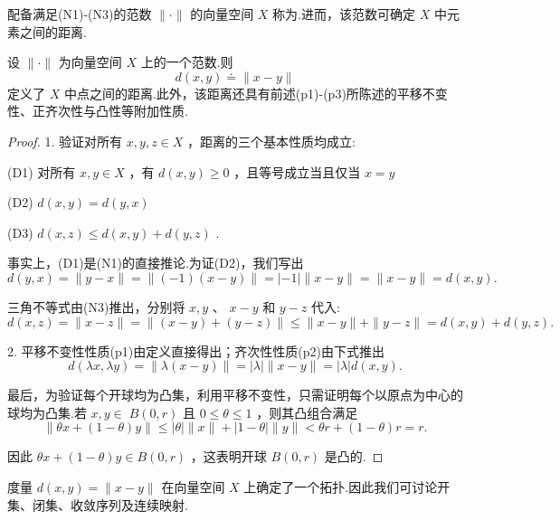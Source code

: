 配备满足(N1)-(N3)的范数 $\|  \cdot  \|$ 的向量空间 $X$ 称为.进而，该范数可确定 $X$ 中元素之间的距离.

\begin{lemma}[由范数定义的距离]
设 $\|  \cdot  \|$ 为向量空间 $X$ 上的一个范数.则
\begin{equation}\tag{2.1}
d\left( {x,y}\right)  \doteq  \| x - y\|
\end{equation}
定义了 $X$ 中点之间的距离.此外，该距离还具有前述(p1)-(p3)所陈述的平移不变性、正齐次性与凸性等附加性质.

\end{lemma}
\begin{proof}
1. 验证对所有 $x,y,z \in  X$ ，距离的三个基本性质均成立:

(D1) 对所有 $x,y \in  X$ ，有 $d\left( {x,y}\right)  \geq  0$ ，且等号成立当且仅当 $x = y$

(D2) $d\left( {x,y}\right)  = d\left( {y,x}\right)$

(D3) $d\left( {x,z}\right)  \leq  d\left( {x,y}\right)  + d\left( {y,z}\right)$ .

事实上，(D1)是(N1)的直接推论.为证(D2)，我们写出
\[
d\left( {y,x}\right)  = \| y - x\|  = \| \left( {-1}\right) \left( {x - y}\right) \|  = \left| {-1}\right| \| x - y\|  = \| x - y\|  = d\left( {x,y}\right) .
\]

三角不等式由(N3)推出，分别将 $x,y$ 、 $x - y$ 和 $y - z$ 代入:
\[
d\left( {x,z}\right)  = \| x - z\|  = \| \left( {x - y}\right)  + \left( {y - z}\right) \|  \leq  \| x - y\|  + \| y - z\|  = d\left( {x,y}\right)  + d\left( {y,z}\right) .
\]

2. 平移不变性性质(p1)由定义直接得出；齐次性性质(p2)由下式推出
\[
d\left( {{\lambda x},{\lambda y}}\right)  = \| \lambda \left( {x - y}\right) \|  = \left| \lambda \right| \| x - y\|  = \left| \lambda \right| d\left( {x,y}\right) .
\]

最后，为验证每个开球均为凸集，利用平移不变性，只需证明每个以原点为中心的球均为凸集.若 $x,y \in \; B\left( {0,r}\right)$ 且 $0 \leq  \theta  \leq  1$ ，则其凸组合满足
\[
\| {\theta x} + \left( {1 - \theta }\right) y\|  \leq  \left| \theta \right| \| x\|  + \left| {1 - \theta }\right| \| y\|  < {\theta r} + \left( {1 - \theta }\right) r = r.
\]

因此 ${\theta x} + \left( {1 - \theta }\right) y \in  B\left( {0,r}\right)$ ，这表明开球 $B\left( {0,r}\right)$ 是凸的.
\end{proof}

度量 $d\left( {x,y}\right)  = \| x - y\|$ 在向量空间 $X$ 上确定了一个拓扑.因此我们可讨论开集、闭集、收敛序列及连续映射.
 
